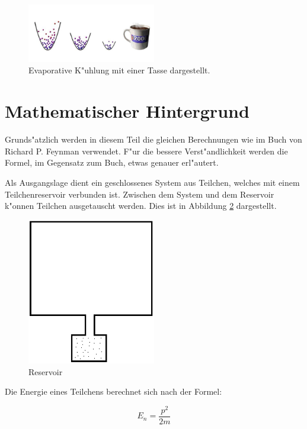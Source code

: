 \begin{refsection}
\begin{figure}
	\centering
	\includegraphics[width = 0.5\textwidth]{./bose/evaporation.png}
	\caption{Evaporative K"uhlung mit einer Tasse dargestellt.}
	\label{fig:EvaporativeKuehlung}
\end{figure}

\section{Mathematischer Hintergrund}

Grunds"atzlich werden in diesem Teil die gleichen Berechnungen wie im Buch von Richard P. Feynman \cite{bose:feynman} verwendet. F"ur die bessere Verst"andlichkeit werden die Formel, im Gegensatz zum Buch, etwas genauer erl"autert.

Als Ausgangslage dient ein geschlossenes System aus Teilchen, welches mit einem Teilchenreservoir verbunden ist. 
Zwischen dem System und dem Reservoir k"onnen Teilchen ausgetauscht werden. Dies ist in Abbildung \ref{fig:reservoir} dargestellt.

\begin{figure}
	\centering
	\includegraphics[width = 0.5\textwidth]{./bose/reservoir.png}
	\caption{Reservoir}
	\label{fig:reservoir}
\end{figure}

Die Energie eines Teilchens berechnet sich nach der Formel:

\begin{equation}
   E_n = \frac{p^2}{2m}
\end{equation}


\end{refsection}
